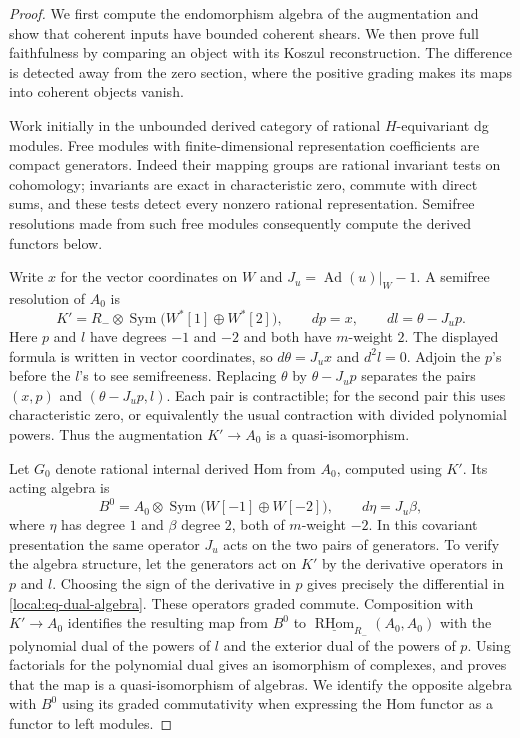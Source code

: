 \documentclass[11pt]{article}
\numberwithin{equation}{section}
\theoremstyle{definition}
\theoremstyle{remark}
\newcommand{\Ad}{\operatorname{Ad}}
\newcommand{\RHom}{\operatorname{RHom}}
\newcommand{\Sym}{\operatorname{Sym}}
\begin{document}
\begin{proof}
We first compute the endomorphism algebra of the augmentation and show
that coherent inputs have bounded coherent shears.  We then prove
full faithfulness by comparing an object with its Koszul reconstruction.
The difference is detected away from the zero section, where the
positive grading makes its maps into coherent objects vanish.

Work initially in the unbounded derived category of rational
$H$-equivariant dg modules.  Free modules with finite-dimensional
representation coefficients are compact generators.  Indeed their
mapping groups are rational invariant tests on cohomology; invariants
are exact in characteristic zero, commute with direct sums, and these
tests detect every nonzero rational representation.  Semifree
resolutions made from such free modules consequently compute the
derived functors below.

Write $x$ for the vector coordinates on $W$ and
$J_u=\Ad(u)|_W-1$.  A semifree resolution of $A_0$ is
\begin{equation}\label{local:eq-augmentation-resolution}
 K'=R_-\otimes\Sym\bigl(W^*[1]\oplus W^*[2]\bigr),
 \qquad dp=x,\qquad dl=\theta-J_up.
\end{equation}
Here $p$ and $l$ have degrees $-1$ and $-2$ and both have $m$-weight
$2$.  The displayed formula is written in vector coordinates, so
$d\theta=J_ux$ and $d^2l=0$.  Adjoin the $p$'s before the $l$'s to
see semifreeness.  Replacing $\theta$ by $\theta-J_up$ separates the
pairs $(x,p)$ and $(\theta-J_up,l)$.  Each pair is contractible;
for the second pair this uses characteristic zero, or equivalently
the usual contraction with divided polynomial powers.  Thus the
augmentation $K'\to A_0$ is a quasi-isomorphism.

Let $G_0$ denote rational internal derived Hom from $A_0$, computed
using $K'$.  Its acting algebra is
\begin{equation}\label{local:eq-dual-algebra}
 B^0=A_0\otimes\Sym\bigl(W[-1]\oplus W[-2]\bigr),
 \qquad d\eta=J_u\beta,
\end{equation}
where $\eta$ has degree $1$ and $\beta$ degree $2$, both of
$m$-weight $-2$.  In this covariant presentation the same operator
$J_u$ acts on the two pairs of generators.  To verify the algebra
structure, let the generators act on $K'$ by the derivative operators
in $p$ and $l$.  Choosing
the sign of the derivative in $p$ gives precisely the differential
in \eqref{local:eq-dual-algebra}.  These operators graded commute.
Composition with $K'\to A_0$ identifies the resulting map from
$B^0$ to $\underline{\RHom}_{R_-}(A_0,A_0)$ with the polynomial
dual of the powers of $l$ and the exterior dual of the powers of $p$.
Using factorials for the polynomial dual gives an isomorphism of
complexes, and proves that the map is a quasi-isomorphism of algebras.
We identify the opposite algebra with $B^0$ using its graded
commutativity when expressing the Hom functor as a functor to left
modules.


\end{proof}
\end{document}
